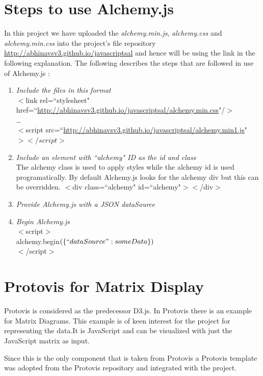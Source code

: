 \section{Steps to use Alchemy.js}
 In this project we have uploaded the \textit{alchemy.min.js}, \textit{alchemy.css} and \textit{alchemy.min.css } into the project's file repository \url{http://abhinavsv3.github.io/javascriptsal} and hence will be using the link in the following explanation. 
The following describes the steps that are followed in use of Alchemy.js :
\begin{enumerate}

\item \textit{Include the files in this format}\\
$<$link rel=``stylesheet" href=``\url{http://abhinavsv3.github.io/javascriptsal/alchemy.min.css}"/$>$
\\
\ldots\\
$<$script src=``\url{http://abhinavsv3.github.io/javascriptsal/alchemy.min1.js}"$></script>$

\item \textit{Include an element with ``alchemy" ID as the id and class }\\
The alchemy class is used to apply styles while the alchemy id is used programatically. By default Alchemy.js looks for the alchemy div but this can be overridden.
$<$div class=``alchemy" id=``alchemy"$><$/div$>$

\item \textit{Provide Alchemy.js with a JSON dataSource}

\item \textit{Begin Alchemy.js}\\
$<$script$>$\\
  alchemy.begin$(\{``dataSource": someData\})$\\
$<$/script$>$\\



\end{enumerate}
\section{Protovis for Matrix Display}
Protovis is considered as the predecessor D3.js. In Protovis there is an example for Matrix Diagrams. This example is of keen interest for the project for representing the data.It is JavaScript and can be visualized with just the JavaScript matrix as input.
\par Since this is the only component that is taken from Protovis a Protovis template was adopted from the Protovis repository and integrated with the project.

